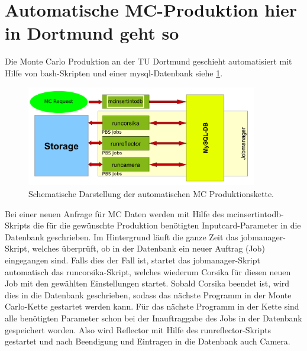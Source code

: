 



\section{Automatische MC-Produktion hier in Dortmund geht so}

Die Monte Carlo Produktion an der TU Dortmund geschieht automatisiert mit Hilfe von bash-Skripten und einer mysql-Datenbank siehe \ref{Jobmanager}.

\begin{figure}
    \centering
    \includegraphics[width=0.9\textwidth]{./Plots/Jobmanager.png}
    \caption{Schematische Darstellung der automatischen MC Produktionskette.}
    \label{Jobmanager}
\end{figure}


Bei einer neuen Anfrage für MC Daten werden mit Hilfe des mcinsertintodb-Skripts die für die gewünschte Produktion benötigten Inputcard-Parameter in die Datenbank geschrieben.
Im Hintergrund läuft die ganze Zeit das jobmanager-Skript, welches überprüft, ob in der Datenbank ein neuer Auftrag (Job) eingegangen sind.
Falls dies der Fall ist, startet das jobmanager-Skript automatisch das runcorsika-Skript, welches wiederum Corsika für diesen neuen Job mit den gewählten Einstellungen startet.
Sobald Corsika beendet ist, wird dies in die Datenbank geschrieben, sodass das nächste Programm in der Monte Carlo-Kette gestartet werden kann.
Für das nächste Programm in der Kette sind alle benötigten Parameter schon bei der Inauftraggabe des Jobs in der Datenbank gespeichert worden.
Also wird Reflector mit Hilfe des runreflector-Skripts gestartet und nach Beendigung und Eintragen in die Datenbank auch Camera.

